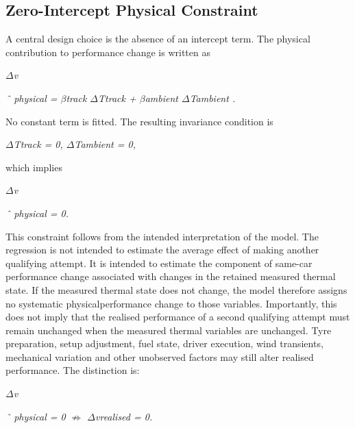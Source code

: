 \subsection{Zero-Intercept Physical Constraint}
A central design choice is the absence of an intercept term. The physical contribution to performance change is written as

\begin{center}\textit{\ensuremath{\Delta}v}\end{center}

\begin{center}\textit{ˆ physical = \ensuremath{\beta}track \ensuremath{\Delta}Ttrack + \ensuremath{\beta}ambient \ensuremath{\Delta}Tambient .}\end{center}

No constant term is fitted. The resulting invariance condition is

\begin{center}\textit{\ensuremath{\Delta}Ttrack = 0,        \ensuremath{\Delta}Tambient = 0,}\end{center}

which implies

\begin{center}\textit{\ensuremath{\Delta}v}\end{center}

\begin{center}\textit{ˆ physical = 0.}\end{center}

This constraint follows from the intended interpretation of the model. The regression is not intended to estimate the average effect of making another qualifying attempt. It is intended to estimate the component of same-car performance change associated with changes in the retained measured thermal state. If the measured thermal state does not change, the model therefore assigns no systematic physicalperformance change to those variables. Importantly, this does not imply that the realised performance of a second qualifying attempt must remain unchanged when the measured thermal variables are unchanged. Tyre preparation, setup adjustment, fuel state, driver execution, wind transients, mechanical variation and other unobserved factors may still alter realised performance. The distinction is:

\begin{center}\textit{\ensuremath{\Delta}v}\end{center}

\begin{center}\textit{ˆ physical = 0 \ensuremath{\nRightarrow} \ensuremath{\Delta}vrealised = 0.}\end{center}


